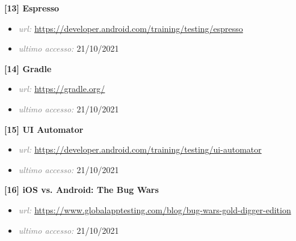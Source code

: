 \bigskip
\textbf{[13] Espresso}
\begin{itemize}[nosep]
\item[] \emph{\textcolor{gray}{url: }} \url{https://developer.android.com/training/testing/espresso}
\item[] \emph{\textcolor{gray}{ultimo accesso: }} 21/10/2021
\end{itemize}
\bigskip
\textbf{[14] Gradle}
\begin{itemize}[nosep]
\item[] \emph{\textcolor{gray}{url: }} \url{https://gradle.org/}
\item[] \emph{\textcolor{gray}{ultimo accesso: }} 21/10/2021
\end{itemize}
\bigskip
\textbf{[15] UI Automator}
\begin{itemize}[nosep]
\item[] \emph{\textcolor{gray}{url: }} \url{https://developer.android.com/training/testing/ui-automator}
\item[] \emph{\textcolor{gray}{ultimo accesso: }} 21/10/2021
\end{itemize}
\bigskip
\textbf{[16] iOS vs. Android: The Bug Wars}
\begin{itemize}[nosep]
\item[] \emph{\textcolor{gray}{url: }} \url{https://www.globalapptesting.com/blog/bug-wars-gold-digger-edition}
\item[] \emph{\textcolor{gray}{ultimo accesso: }} 21/10/2021
\end{itemize}
\bigskip








